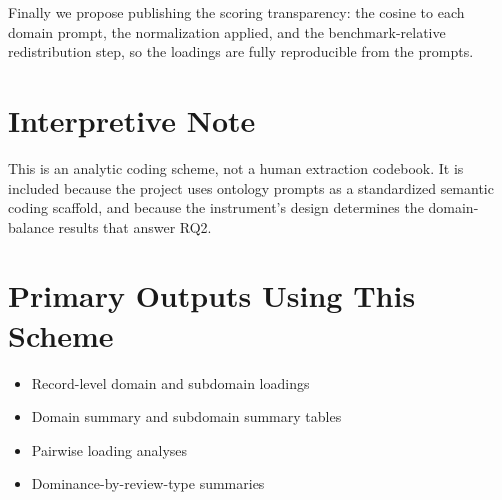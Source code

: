 \documentclass[11pt]{article}
\begin{document}
Finally we propose publishing the scoring transparency: the cosine to each domain prompt, the normalization applied, and the benchmark-relative redistribution step, so the loadings are fully reproducible from the prompts.


\section*{Interpretive Note}
This is an analytic coding scheme, not a human extraction codebook. It is included because the project uses ontology prompts as a standardized semantic coding scaffold, and because the instrument's design determines the domain-balance results that answer RQ2.


\section*{Primary Outputs Using This Scheme}
\begin{itemize}
\item Record-level domain and subdomain loadings
\item Domain summary and subdomain summary tables
\item Pairwise loading analyses
\item Dominance-by-review-type summaries
\end{itemize}
\end{document}
